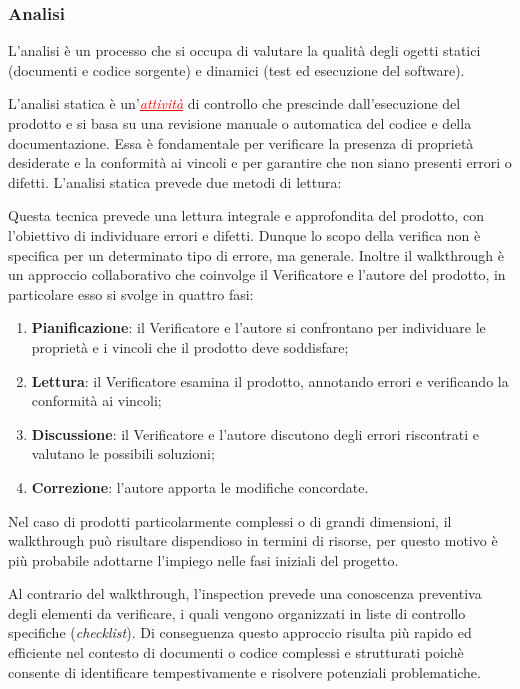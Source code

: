 \subsubsection{Analisi}
L'analisi è un processo che si occupa di valutare la qualità degli ogetti statici (documenti e codice sorgente) e dinamici
(test ed esecuzione del software).

L'analisi statica è un'\textcolor{red}{\uline{\textit{attività}}} di controllo che prescinde dall'esecuzione del prodotto e si basa su una revisione manuale o automatica
del codice e della documentazione. Essa è fondamentale per verificare la presenza di proprietà desiderate e la conformità ai vincoli e
per garantire che non siano presenti errori o difetti. L'analisi statica prevede due metodi di lettura:

Questa tecnica prevede una lettura integrale e approfondita del prodotto, con l'obiettivo di individuare errori e difetti. Dunque lo scopo della verifica
non è specifica per un determinato tipo di errore, ma generale. Inoltre il walkthrough è un approccio collaborativo che coinvolge il Verificatore
e l'autore del prodotto, in particolare esso si svolge in quattro fasi:
\begin{enumerate}
    \item \textbf{Pianificazione}: il Verificatore e l'autore si confrontano per individuare le proprietà e i vincoli che il prodotto deve soddisfare;
    \item \textbf{Lettura}: il Verificatore esamina il prodotto, annotando errori e verificando la conformità ai vincoli;
    \item \textbf{Discussione}: il Verificatore e l'autore discutono degli errori riscontrati e valutano le possibili soluzioni;
    \item \textbf{Correzione}: l'autore apporta le modifiche concordate.
\end{enumerate}
Nel caso di prodotti particolarmente complessi o di grandi dimensioni, il walkthrough può risultare dispendioso in termini di risorse,
per questo motivo è più probabile adottarne l'impiego nelle fasi iniziali del progetto.

Al contrario del walkthrough, l'inspection prevede una conoscenza preventiva degli elementi da verificare, i quali vengono organizzati in
liste di controllo specifiche (\textit{checklist}). Di conseguenza questo approccio risulta più rapido ed efficiente nel contesto di documenti
o codice complessi e strutturati poichè consente di identificare tempestivamente e risolvere potenziali problematiche.

